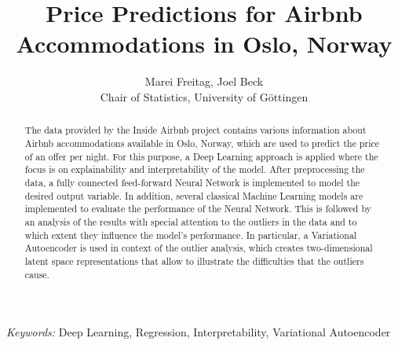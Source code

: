 \begin{titlepage}

    \title{\bf Price Predictions for Airbnb Accommodations in Oslo, Norway}

    \author{Marei Freitag, Joel Beck \hspace{.2cm}\\ Chair of Statistics, University of G\"ottingen\\}

    \maketitle

    \bigskip

    \begin{abstract}
        \noindent The data provided by the Inside Airbnb project contains various information about Airbnb accommodations available in Oslo, Norway, which are used to predict the price of an offer per night.
        For this purpose, a Deep Learning approach is applied where the focus is on explainability and interpretability of the model. After preprocessing the data, a fully connected feed-forward Neural Network is implemented to model the desired output variable.
        In addition, several classical Machine Learning models are implemented to evaluate the performance of the Neural Network.
        This is followed by an analysis of the results with special attention to the outliers in the data and to which extent they influence the model's performance.
        In particular, a Variational Autoencoder is used in context of the outlier
        analysis, which creates two-dimensional latent space representations that allow to illustrate the difficulties that the outliers cause.
    \end{abstract}

    \noindent%
    {\it Keywords:}  Deep Learning, Regression, Interpretability, Variational Autoencoder
    \vfill

\end{titlepage}

